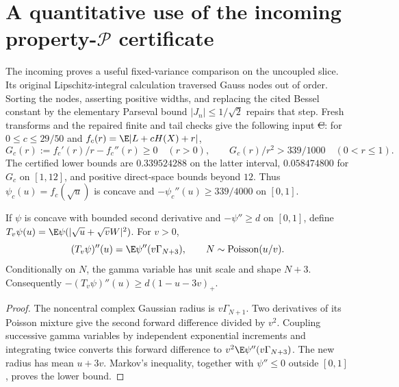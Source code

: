 \section{A quantitative use of the incoming property-$\mathcal P$ certificate}
\label{sec:quantitative-P-transfer-20261021}
The incoming  proves a useful
fixed-variance comparison on the uncoupled slice. Its original
Lipschitz-integral calculation traversed Gauss nodes out of order.
Sorting the nodes, asserting positive widths, and replacing the cited
Bessel constant by the elementary Parseval bound $|J_n|\le1/\sqrt2$
repairs that step. Fresh transforms and the repaired finite and tail
checks give the following input \st{C}:
for $0\le c\le29/50$ and
$f_c(r)=\E|L+cH(X)+r|$,
\[
 G_c(r):=f_c'(r)/r-f_c''(r)\ge0\quad(r>0),\qquad
 G_c(r)/r^2>339/1000\quad(0<r\le1).
\]
The certified lower bounds are $0.339524288$ on the latter interval,
$0.058474800$ for $G_c$ on $[1,12]$, and positive direct-space
bounds beyond $12$. Thus $\psi_c(u)=f_c(\sqrt u)$ is concave and
$-\psi_c''(u)\ge339/4000$ on $[0,1]$.

\begin{lemma}
\label{lem:P-curvature-smoothing-20261021}
If $\psi$ is concave with bounded second derivative and
$-\psi''\ge d$ on $[0,1]$, define
$T_v\psi(u)=\E\psi(|\sqrt u+\sqrt vW|^2)$.
For $v>0$,
\[
 (T_v\psi)''(u)=\E\psi''(v\Gamma_{N+3}),\qquad
 N\sim\operatorname{Poisson}(u/v).
\]
Conditionally on $N$, the gamma variable has unit scale and shape
$N+3$. Consequently $-(T_v\psi)''(u)\ge d(1-u-3v)_+$.
\end{lemma}
\begin{proof}
The noncentral complex Gaussian radius is $v\Gamma_{N+1}$.
Two derivatives of its Poisson mixture give the second forward
difference divided by $v^2$. Coupling successive gamma variables by
independent exponential increments and integrating twice converts
this forward difference to $v^2\E\psi''(v\Gamma_{N+3})$.
The new radius has mean $u+3v$. Markov's inequality, together with
$\psi''\le0$ outside $[0,1]$, proves the lower bound.
\end{proof}


